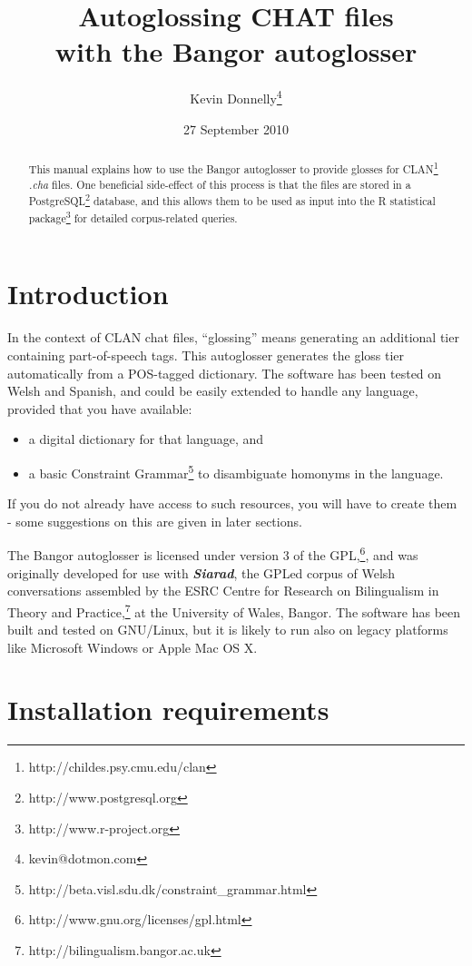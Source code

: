 \documentclass[a4paper,10pt]{article}
\title{\textbf{Autoglossing CHAT files\\with the Bangor autoglosser}}
\author{Kevin Donnelly\thanks{kevin@dotmon.com}}
\date{27 September 2010}
\begin{document}
\maketitle

\begin{abstract}
This manual explains how to use the Bangor autoglosser to provide glosses for  CLAN\footnote{http://childes.psy.cmu.edu/clan} \textit{.cha} files.  One beneficial side-effect of this process is that the files are stored in a PostgreSQL\footnote{http://www.postgresql.org} database, and this allows them to be used as input into the R statistical package\footnote{http://www.r-project.org} for detailed corpus-related queries.
\end{abstract}


\section{Introduction}
\label{sec:intro}

In the context of CLAN chat files, ``glossing'' means generating an additional tier containing part-of-speech tags.  This autoglosser generates the gloss tier automatically from a POS-tagged dictionary.  The software has been tested on Welsh and Spanish, and could be easily extended to handle any language, provided that you have available:
\begin{itemize}
\item a digital dictionary for that language, and
\item a basic Constraint Grammar\footnote{http://beta.visl.sdu.dk/constraint\_grammar.html} to disambiguate homonyms in the language.
\end{itemize}
If you do not already have access to such resources, you will have to create them - some suggestions on this are given in later sections. 

The Bangor autoglosser is licensed under version 3 of the GPL,\footnote{http://www.gnu.org/licenses/gpl.html}, and was originally developed for use with \textit{\textbf{Siarad}}, the GPLed corpus of Welsh conversations assembled by the ESRC Centre for Research on Bilingualism in Theory and Practice,\footnote{http://bilingualism.bangor.ac.uk} at the University of Wales, Bangor.  The software has been built and tested on GNU/Linux, but it is likely to run also on legacy platforms like Microsoft Windows or Apple Mac OS X.


\section{Installation requirements}
\label{sec:requirements}
\end{document}
